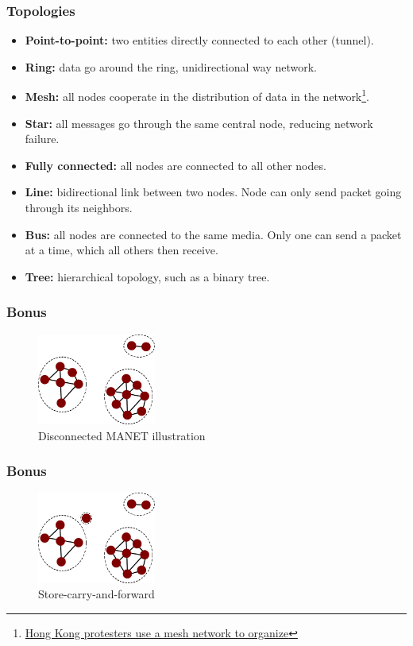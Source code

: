   \begin{frame}
    \frametitle{Topologies}
    \begin{itemize}
      \item \textbf{Point-to-point:} two entities directly connected to each other (tunnel).\pause
      \item \textbf{Ring:} data go around the ring, unidirectional way network.\pause
      \item \textbf{Mesh:} all nodes cooperate in the distribution of data in the network\footnote{\color{blue}\href{http://www.newscientist.com/article/dn26285-hong-kong-protesters-use-a-mesh-network-to-organise.html}{Hong Kong protesters use a mesh network to organize}}.\pause
      \item \textbf{Star:} all messages go through the same central node, reducing network failure.\pause
      \item \textbf{Fully connected:} all nodes are connected to all other nodes.\pause
      \item \textbf{Line:} bidirectional link between two nodes. Node can only send packet going through its neighbors.\pause
      \item \textbf{Bus:} all nodes are connected to the same media. Only one can send a packet at a time, which all others then receive.\pause
      \item \textbf{Tree:} hierarchical topology, such as a binary tree.
    \end{itemize}
  \end{frame}
  \begin{frame}
    \frametitle{Bonus}
    \begin{figure}[p]
      \centering
      \includegraphics[height=3cm]{./imgs/dmanet.pdf}
      \caption{Disconnected MANET illustration \cite{ieee12khabbaz}}
      \label{fig:dmanet}
    \end{figure}
  \end{frame}
  \begin{frame}
    \frametitle{Bonus}
    \begin{figure}[p]
      \centering
      \includegraphics[height=3cm]{./imgs/store-carry-fwd-0.pdf}
      \caption{Store-carry-and-forward \cite{ieee12khabbaz}}
    \end{figure}
  \end{frame}
